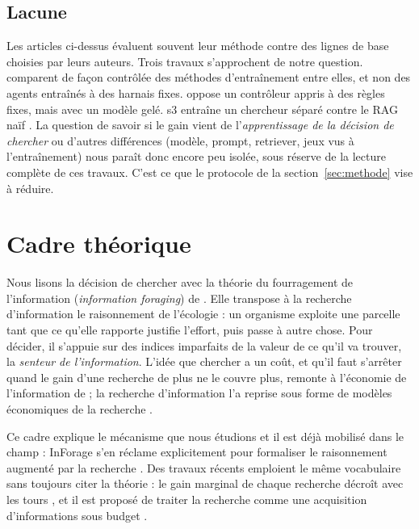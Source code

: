 \subsection{Lacune}
Les articles ci-dessus évaluent souvent leur méthode contre des lignes de base choisies par leurs auteurs. Trois travaux s'approchent de notre question. \citet{zhao2026retrieval} comparent de façon contrôlée des méthodes d'entraînement entre elles, et non des agents entraînés à des harnais fixes. \citet{raikote2026policy} oppose un contrôleur appris à des règles fixes, mais avec un modèle gelé. s3 entraîne un chercheur séparé contre le RAG naïf \citep{jiang2025s3}. La question de savoir si le gain vient de l'\emph{apprentissage de la décision de chercher} ou d'autres différences (modèle, prompt, retriever, jeux vus à l'entraînement) nous paraît donc encore peu isolée, sous réserve de la lecture complète de ces travaux. C'est ce que le protocole de la section~\ref{sec:methode} vise à réduire.

\section{Cadre théorique}\label{sec:cadre}

Nous lisons la décision de chercher avec la théorie du fourragement de l'information (\emph{information foraging}) de \citet{pirolli1999information}. Elle transpose à la recherche d'information le raisonnement de l'écologie : un organisme exploite une parcelle tant que ce qu'elle rapporte justifie l'effort, puis passe à autre chose. Pour décider, il s'appuie sur des indices imparfaits de la valeur de ce qu'il va trouver, la \emph{senteur de l'information}. L'idée que chercher a un coût, et qu'il faut s'arrêter quand le gain d'une recherche de plus ne le couvre plus, remonte à l'économie de l'information de \citet{stigler1961economics} ; la recherche d'information l'a reprise sous forme de modèles économiques de la recherche \citep{azzopardi2011economics}.

Ce cadre explique le mécanisme que nous étudions et il est déjà mobilisé dans le champ : InForage s'en réclame explicitement pour formaliser le raisonnement augmenté par la recherche \citep{qian2025scent}. Des travaux récents emploient le même vocabulaire sans toujours citer la théorie : le gain marginal de chaque recherche décroît avec les tours \citep{zhang2026search}, et il est proposé de traiter la recherche comme une acquisition d'informations sous budget \citep{poudel2026reasoning}.

